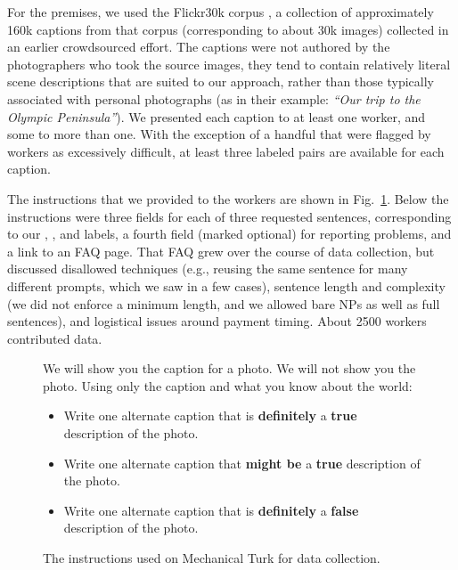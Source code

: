 For the premises, we used the Flickr30k corpus \cite{hodoshimage}, a collection of approximately 160k captions from that corpus (corresponding to about 30k images) collected in an earlier crowdsourced effort. The captions were not authored by the photographers who took the source images, they tend to contain relatively literal scene descriptions that are suited to our approach, rather than those typically associated with personal photographs (as in their example: \textit{``Our trip to the Olympic Peninsula''}). We presented each caption to at least one worker, and some to more than one. With the exception of a handful that were flagged by workers as excessively difficult, at least three labeled pairs are available for each caption.

The instructions that we provided to the workers are shown in Fig.~\ref{instructions-1}. Below the instructions were three fields for each of three requested sentences, corresponding to our , , and  labels, a fourth field (marked optional) for reporting problems, and a link to an FAQ page. That FAQ grew over the course of data collection, but discussed disallowed techniques (e.g., reusing the same sentence for many different prompts, which we saw in a few cases), sentence length and complexity (we did not enforce a minimum length, and we allowed bare NPs as well as full sentences), and logistical issues around payment timing. About 2500 workers contributed data.

\begin{figure}
\footnotesize
We will show you the caption for a photo. We will not show you the photo. Using only the caption and what you know about the world:
\begin{itemize}
\item Write one alternate caption that is \textbf{definitely} a \textbf{true} description of the photo. 
\item Write one alternate caption that \textbf{might be} a \textbf{true} description of the photo. 
\item Write one alternate caption that is \textbf{definitely} a \textbf{false} description of the photo. 
\end{itemize}
\caption{\label{instructions-1}The instructions used on Mechanical Turk for data collection.}
\end{figure}

